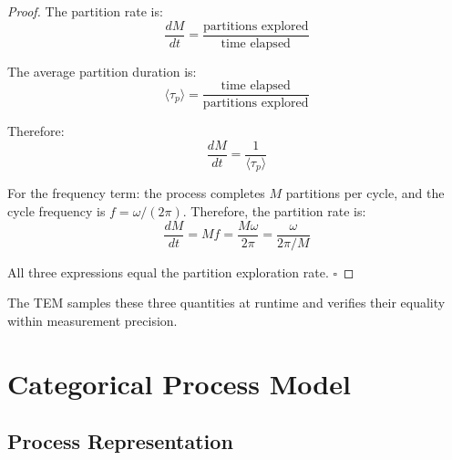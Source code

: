 \documentclass[twocolumn,10pt]{article}
\theoremstyle{definition}
\theoremstyle{remark}
\begin{document}
\begin{proof}
The partition rate is:
\begin{equation}
    \frac{dM}{dt} = \frac{\text{partitions explored}}{\text{time elapsed}}
\end{equation}

The average partition duration is:
\begin{equation}
    \langle \tau_p \rangle = \frac{\text{time elapsed}}{\text{partitions explored}}
\end{equation}

Therefore:
\begin{equation}
    \frac{dM}{dt} = \frac{1}{\langle \tau_p \rangle}
\end{equation}

For the frequency term: the process completes $M$ partitions per cycle, and the cycle frequency is $f = \omega/(2\pi)$. Therefore, the partition rate is:
\begin{equation}
    \frac{dM}{dt} = M f = \frac{M \omega}{2\pi} = \frac{\omega}{2\pi/M}
\end{equation}

All three expressions equal the partition exploration rate. $\square$
\end{proof}

The TEM samples these three quantities at runtime and verifies their equality within measurement precision.

\section{Categorical Process Model}
\label{sec:process_model}

\subsection{Process Representation}
\end{document}
